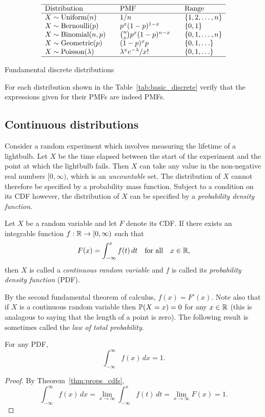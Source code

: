 \begin{table}[h]
\[\begin{array}{lclcl}\hline
\text{Distribution} 			& & \text{PMF}					& & \text{Range}	\\ \hline
X\sim\text{Uniform}(n)			& & 1/n 						& & \{1,2,\ldots,n\}\\
X\sim\text{Bernoulli}(p)		& & p^x(1-p)^{1-x} 				& & \{0,1\}			\\
X\sim\text{Binomial}(n,p)		& & \binom{n}{x}p^x(1-p)^{n-x} 	& & \{0,1,\ldots,n\}\\
X\sim\text{Geometric}(p)		& & (1-p)^{x}p 					& & \{0,1,\ldots\}	\\
X\sim\text{Poisson}(\lambda)	& & \lambda^x e^{-\lambda}/x! 	& & \{0,1,\ldots\} 	\\ \hline
\end{array}\]
\caption{Fundamental discrete distributions\label{tab:basic_discrete}}
\end{table}

\begin{exercise}
For each distribution shown in the Table~\ref{tab:basic_discrete} verify that the expressions given for their PMFs are indeed PMFs.
\end{exercise}

\subsection{Continuous distributions}

Consider a random experiment which involves measuring the lifetime of a lightbulb. Let $X$ be the time elapsed between the start of the experiment and the point at which the lightbulb fails. Then $X$ can take any value in the non-negative real numbers $[0,\infty)$, which is an \emph{uncountable} set. The distribution of $X$ cannot therefore be specified by a probability mass function. Subject to a condition on its CDF however, the distribution of $X$ can be specified by a \emph{probability density function}.

\begin{definition}\label{def:cts_rvs}
Let $X$ be a random variable and let $F$ denote its CDF. If there exists an integrable function $f:\mathbb{R}\to [0,\infty)$ such that 
\[
F(x) = \int_{-\infty}^x f(t)\,dt \text{\quad for all\quad} x\in\mathbb{R},
\]
then $X$ is called a \emph{continuous random variable} and $f$ is called its \emph{probability density function} (PDF).
\end{definition}
By the second fundamental theorem of calculus, $f(x) = F'(x)$. Note also that if $X$ is a continuous random variable then $\mathbb{P}(X=x)=0$ for any $x\in\mathbb{R}$ (this is analagous to saying that the length of a point is zero). The following result is sometimes called the \emph{law of total probability}.
\begin{proposition}
For any PDF,
\[
\displaystyle\int_{-\infty}^{\infty} f(x)\,dx = 1.
\]
\begin{proof}
By Theorem~\ref{thm:props_cdfs},
\[
\int_{-\infty}^{\infty} f(x)\,dx 
	= \lim_{x\to\infty}\int_{-\infty}^{x} f(t)\,dt
	= \lim_{x\to\infty}F(x)
	= 1.
\]
\end{proof}
\end{proposition}


